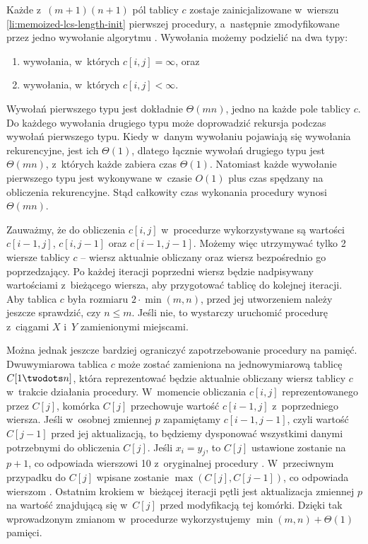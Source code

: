 Każde z~$(m+1)(n+1)$ pól tablicy $c$ zostaje zainicjalizowane w~wierszu \ref{li:memoized-lcs-length-init} pierwszej procedury, a~następnie zmodyfikowane przez jedno wywołanie algorytmu .
Wywołania  możemy podzielić na dwa typy:
\begin{enumerate}
	\renewcommand{\labelenumi}{(\roman{enumi})}
	\item wywołania, w~których $c[i,j]=\infty$, oraz
	\item wywołania, w~których $c[i,j]<\infty$.
\end{enumerate}
Wywołań pierwszego typu jest dokładnie $\Theta(mn)$, jedno na każde pole tablicy $c$.
Do każdego wywołania drugiego typu może doprowadzić rekursja podczas wywołań pierwszego typu.
Kiedy w~danym wywołaniu  pojawiają się wywołania rekurencyjne, jest ich $\Theta(1)$, dlatego łącznie wywołań drugiego typu jest $\Theta(mn)$, z~których każde zabiera czas $\Theta(1)$. Natomiast każde wywołanie pierwszego typu jest wykonywane w~czasie $O(1)$ plus czas spędzany na obliczenia rekurencyjne.
Stąd całkowity czas wykonania procedury  wynosi $\Theta(mn)$.

\exercise %
Zauważmy, że do obliczenia $c[i,j]$ w~procedurze  wykorzystywane są wartości $c[i-1,j]$, $c[i,j-1]$ oraz $c[i-1,j-1]$.
Możemy więc utrzymywać tylko 2 wiersze tablicy $c$ -- wiersz aktualnie obliczany oraz wiersz bezpośrednio go poprzedzający.
Po każdej iteracji poprzedni wiersz będzie nadpisywany wartościami z~bieżącego wiersza, aby przygotować tablicę do kolejnej iteracji.
Aby tablica $c$ była rozmiaru $2\cdot\min(m,n)$, przed jej utworzeniem należy jeszcze sprawdzić, czy $n\le m$.
Jeśli nie, to wystarczy uruchomić procedurę z~ciągami $X$ i~$Y$ zamienionymi miejscami.

Można jednak jeszcze bardziej ograniczyć zapotrzebowanie procedury na pamięć.
Dwuwymiarowa tablica $c$ może zostać zamieniona na jednowymiarową tablicę $C[1\twodots n]$, która reprezentować będzie aktualnie obliczany wiersz tablicy $c$ w~trakcie działania procedury.
W~momencie obliczania $c[i,j]$ reprezentowanego przez $C[j]$, komórka $C[j]$ przechowuje wartość $c[i-1,j]$ z~poprzedniego wiersza.
Jeśli w~osobnej zmiennej $p$ zapamiętamy $c[i-1,j-1]$, czyli wartość $C[j-1]$ przed jej aktualizacją, to będziemy dysponować wszystkimi danymi potrzebnymi do obliczenia $C[j]$.
Jeśli $x_i=y_j$, to $C[j]$ ustawione zostanie na $p+1$, co odpowiada wierszowi 10 z~oryginalnej procedury .
W~przeciwnym przypadku do $C[j]$ wpisane zostanie $\max(C[j],C[j-1])$, co odpowiada wierszom .
Ostatnim krokiem w~bieżącej iteracji pętli jest aktualizacja zmiennej $p$ na wartość znajdującą się w~$C[j]$ przed modyfikacją tej komórki.
Dzięki tak wprowadzonym zmianom w~procedurze wykorzystujemy $\min(m,n)+\Theta(1)$ pamięci.

